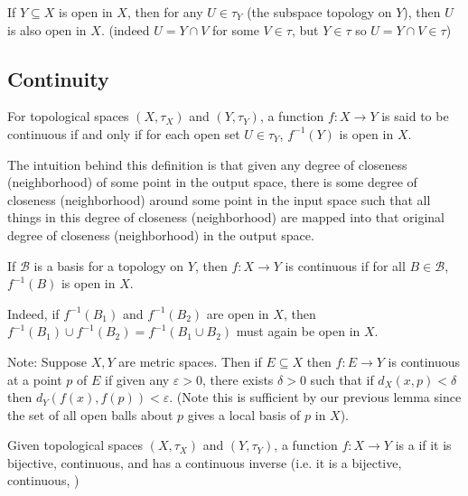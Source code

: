 \documentclass[12pt, a4paper, oneside, openright, titlepage]{book}
\begin{document}
\begin{lem}
    If $Y \subseteq X$ is open in $X$, then for any $U \in \tau_Y$ (the subspace topology on $Y$), then $U$ is also open in $X$. (indeed $U = Y\cap V$ for some $V \in \tau$, but $Y \in \tau$ so $U = Y\cap V \in \tau$)
\end{lem}


\subsection{Continuity}


\begin{defn}
    For topological spaces $(X,\tau_X)$ and $(Y,\tau_Y)$, a function $f:X\rightarrow Y$ is said to be continuous if and only if for each open set $U \in \tau_Y$, $f^{-1}(Y)$ is open in $X$.
\end{defn}


The intuition behind this definition is that given any degree of closeness (neighborhood) of some point in the output space, there is some degree of closeness (neighborhood) around some point in the input space such that all things in this degree of closeness (neighborhood) are mapped into that original degree of closeness (neighborhood) in the output space.

\begin{lem}
    If $\mathcal{B}$ is a basis for a topology on $Y$, then $f:X\rightarrow Y$ is continuous if for all $B \in \mathcal{B}$, $f^{-1}(B)$ is open in $X$.
\end{lem}

Indeed, if $f^{-1}(B_1)$ and $f^{-1}(B_2)$ are open in $X$, then $f^{-1}(B_1)\cup f^{-1}(B_2) = f^{-1}(B_1\cup B_2)$ must again be open in $X$.


Note: Suppose $X,Y$ are metric spaces. Then if $E \subseteq X$ then $f:E\rightarrow Y$ is continuous at a point $p$ of $E$ if given any $\varepsilon > 0$, there exists $\delta > 0$ such that if $d_X(x,p) < \delta$ then $d_Y(f(x),f(p)) < \varepsilon$. (Note this is sufficient by our previous lemma since the set of all open balls about $p$ gives a local basis of $p$ in $X$).



\begin{defn}
    Given topological spaces $(X,\tau_X)$ and $(Y,\tau_Y)$, a function $f:X\rightarrow Y$ is a  if it is bijective, continuous, and has a continuous inverse (i.e. it is a bijective, continuous, )
\end{defn}
\end{document}
